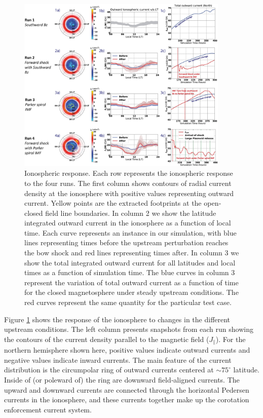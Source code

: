 \begin{figure}
    \centering
    \includegraphics[width=0.9\textwidth]{images3/ionosphere-currents.jpg}
    \caption{Ionospheric response. Each row represents the ionospheric response to the four runs. The first column shows contours of radial current density at the ionosphere with positive values representing outward current. Yellow points are the extracted footprints at the open‐closed field line boundaries. In column 2 we show the latitude integrated outward current in the ionosphere as a function of local time. Each curve represents an instance in our simulation, with blue lines representing times before the upstream perturbation reaches the bow shock and red lines representing times after. In column 3 we show the total integrated outward current for all latitudes and local times as a function of simulation time. The blue curves in column 3 represent the variation of total outward current as a function of time for the closed magnetosphere under steady upstream conditions. The red curves represent the same quantity for the particular test case.}
    \label{fig:ionosphere-currents}
\end{figure}

Figure \ref{fig:ionosphere-currents} shows the response of the ionosphere to changes in the different upstream conditions. The left column presents snapshots from each run showing the contours of the current density parallel to the magnetic field ($J_\parallel$). For the northern hemisphere shown here, positive values indicate outward currents and negative values indicate inward currents. The main feature of the current distribution is the circumpolar ring of outward currents centered at $\sim75^\circ$ latitude. Inside of (or poleward of) the ring are downward field‐aligned currents. The upward and downward currents are connected through the horizontal Pedersen currents in the ionosphere, and these currents together make up the corotation enforcement current system. 


